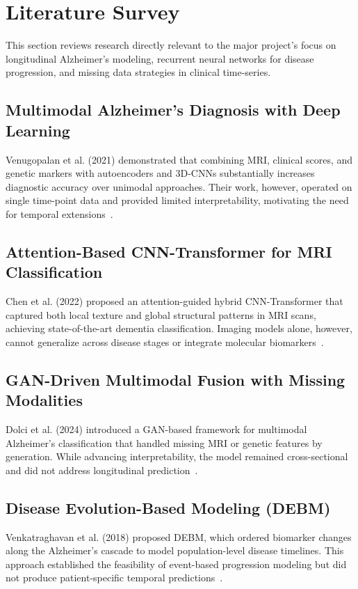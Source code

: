 \documentclass[12pt,singleside,a4paper]{article}
\begin{document}
\pagebreak
\section{Literature Survey}

This section reviews research directly relevant to the major project's focus on longitudinal Alzheimer's modeling, recurrent neural networks for disease progression, and missing data strategies in clinical time-series.

\subsection{Multimodal Alzheimer's Diagnosis with Deep Learning}
Venugopalan et al. (2021) demonstrated that combining MRI, clinical scores, and genetic markers with autoencoders and 3D-CNNs substantially increases diagnostic accuracy over unimodal approaches. Their work, however, operated on single time-point data and provided limited interpretability, motivating the need for temporal extensions~\cite{venugopalan2021}.

\subsection{Attention-Based CNN-Transformer for MRI Classification}
Chen et al. (2022) proposed an attention-guided hybrid CNN-Transformer that captured both local texture and global structural patterns in MRI scans, achieving state-of-the-art dementia classification. Imaging models alone, however, cannot generalize across disease stages or integrate molecular biomarkers~\cite{chen2022}.

\subsection{GAN-Driven Multimodal Fusion with Missing Modalities}
Dolci et al. (2024) introduced a GAN-based framework for multimodal Alzheimer's classification that handled missing MRI or genetic features by generation. While advancing interpretability, the model remained cross-sectional and did not address longitudinal prediction~\cite{dolci2024}.

\subsection{Disease Evolution-Based Modeling (DEBM)}
Venkatraghavan et al. (2018) proposed DEBM, which ordered biomarker changes along the Alzheimer's cascade to model population-level disease timelines. This approach established the feasibility of event-based progression modeling but did not produce patient-specific temporal predictions~\cite{venkatraghavan2018}.
\end{document}
